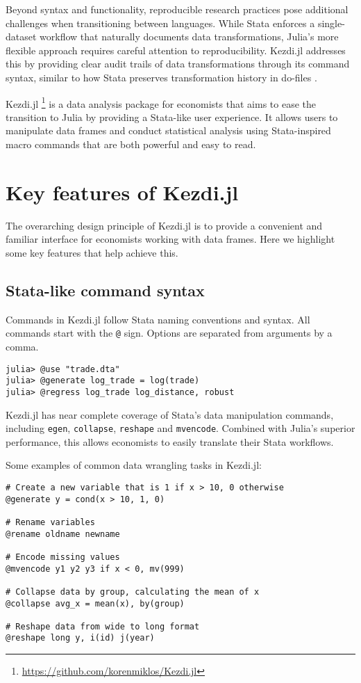 \documentclass{juliacon}
\begin{document}
Beyond syntax and functionality, reproducible research practices pose additional challenges when transitioning between languages. While Stata enforces a single-dataset workflow that naturally documents data transformations, Julia's more flexible approach requires careful attention to reproducibility. Kezdi.jl addresses this by providing clear audit trails of data transformations through its command syntax, similar to how Stata preserves transformation history in do-files \citep{koren2024ten}.

Kezdi.jl \footnote{\url{https://github.com/korenmiklos/Kezdi.jl}} is a data analysis package for economists that aims to ease the transition to Julia by providing a Stata-like user experience. It allows users to manipulate data frames and conduct statistical analysis using Stata-inspired macro commands that are both powerful and easy to read.

\section{Key features of Kezdi.jl}

The overarching design principle of Kezdi.jl is to provide a convenient and familiar interface for economists working with data frames. Here we highlight some key features that help achieve this.

\subsection{Stata-like command syntax}

Commands in Kezdi.jl follow Stata naming conventions and syntax. All commands start with the \texttt{@} sign. Options are separated from arguments by a comma.

\begin{verbatim}
julia> @use "trade.dta"
julia> @generate log_trade = log(trade)
julia> @regress log_trade log_distance, robust
\end{verbatim}

Kezdi.jl has near complete coverage of Stata's data manipulation commands, including \texttt{egen}, \texttt{collapse}, \texttt{reshape} and \texttt{mvencode}. Combined with Julia's superior performance, this allows economists to easily translate their Stata workflows.

Some examples of common data wrangling tasks in Kezdi.jl:

\begin{verbatim}
# Create a new variable that is 1 if x > 10, 0 otherwise
@generate y = cond(x > 10, 1, 0)

# Rename variables
@rename oldname newname

# Encode missing values
@mvencode y1 y2 y3 if x < 0, mv(999)

# Collapse data by group, calculating the mean of x
@collapse avg_x = mean(x), by(group)

# Reshape data from wide to long format
@reshape long y, i(id) j(year)
\end{verbatim}
\end{document}
